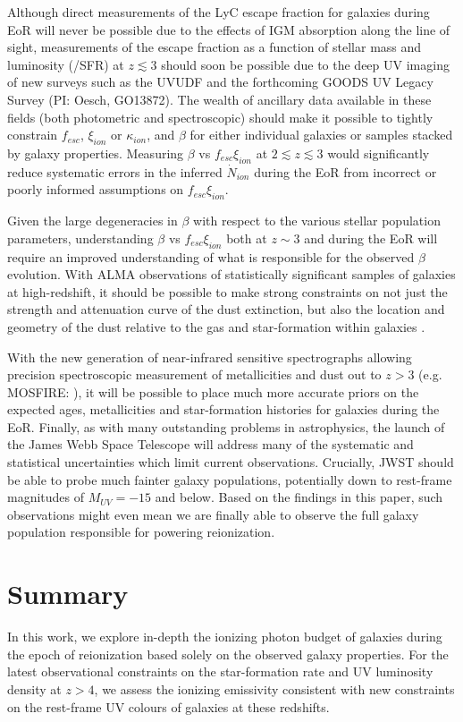 Although direct measurements of the LyC escape fraction for galaxies during EoR will never be possible due to the effects of IGM absorption along the line of sight, measurements of the escape fraction as a function of stellar mass and luminosity (/SFR) at $z \lesssim 3$ should soon be possible due to the deep UV imaging of new surveys such as the UVUDF \citep{Teplitz:2013jg} and the forthcoming GOODS UV Legacy Survey (PI: Oesch, GO13872). The wealth of ancillary data available in these fields (both photometric and spectroscopic) should make it possible to tightly constrain $f_{esc}$, $\xi_{ion}$ or $\kappa_{ion}$, and $\beta$ for either individual galaxies or samples stacked by galaxy properties. Measuring $\beta$ vs $f_{esc}\xi_{ion}$ at $2 \lesssim z \lesssim 3$ would significantly reduce systematic errors in the inferred $\dot{N}_{ion}$ during the EoR from incorrect or poorly informed assumptions on $f_{esc}\xi_{ion}$.

Given the large degeneracies in $\beta$ with respect to the various stellar population parameters, understanding  $\beta$ vs $f_{esc}\xi_{ion}$ both at $z\sim3$ and during the EoR will require an improved understanding of what is responsible for the observed $\beta$ evolution. With ALMA observations of statistically significant samples of galaxies at high-redshift, it should be possible to make strong constraints on not just the strength and attenuation curve of the dust extinction, but also the location and geometry of the dust relative to the gas and star-formation within galaxies \citep{DeBreuck:2014eo}.

With the new generation of near-infrared sensitive spectrographs allowing precision spectroscopic measurement of metallicities and dust out to $z >3$ (e.g. MOSFIRE: \citet{Kriek:2014uw}), it will be possible to place much more accurate priors on the expected ages, metallicities and star-formation histories for galaxies during the EoR. Finally, as with many outstanding problems in astrophysics, the launch of the James Webb Space Telescope will address many of the systematic and statistical uncertainties which limit current observations. Crucially, JWST should be able to probe much fainter galaxy populations, potentially down to rest-frame magnitudes of $M_{UV} = -15$ and below. Based on the findings in this paper, such observations might even mean we are finally able to observe the full galaxy population responsible for powering reionization.

\section{Summary}\label{sec:summary}
In this work, we explore in-depth the ionizing photon budget of galaxies during the epoch of reionization based solely on the observed galaxy properties. For the latest observational constraints on the star-formation rate and UV luminosity density at $z > 4$, we assess the ionizing emissivity consistent with new constraints on the rest-frame UV colours of galaxies at these redshifts.

